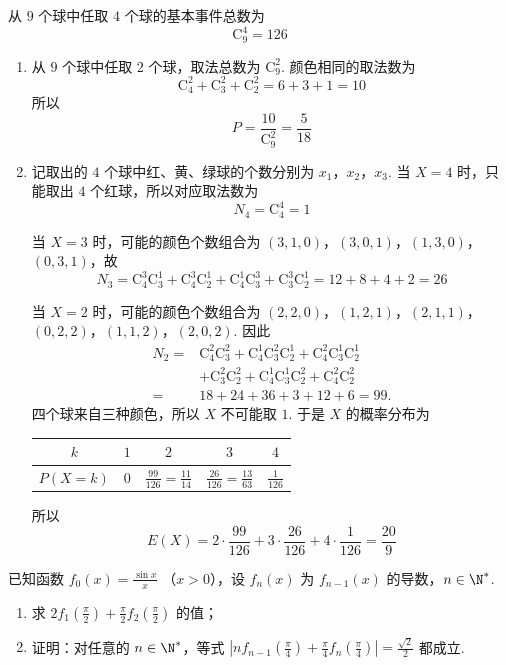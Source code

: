 \begin{solution}
从 \(9\) 个球中任取 \(4\) 个球的基本事件总数为
\[
\mathrm C_9^4=126
\]

\begin{enumerate}
\item 从 \(9\) 个球中任取 \(2\) 个球，取法总数为 \(\mathrm C_9^2\). 颜色相同的取法数为
\[
\mathrm C_4^2+\mathrm C_3^2+\mathrm C_2^2=6+3+1=10
\]
所以
\[
P=\frac{10}{\mathrm C_9^2}=\frac5{18}
\]

\item 记取出的 \(4\) 个球中红、黄、绿球的个数分别为 \(x_1\)，\(x_2\)，\(x_3\). 当 \(X=4\) 时，只能取出 \(4\) 个红球，所以对应取法数为
\[
N_4=\mathrm C_4^4=1
\]

当 \(X=3\) 时，可能的颜色个数组合为 \((3,1,0)\)，\((3,0,1)\)，\((1,3,0)\)，\((0,3,1)\)，故
\[
N_3=\mathrm C_4^3\mathrm C_3^1+\mathrm C_4^3\mathrm C_2^1+\mathrm C_4^1\mathrm C_3^3+\mathrm C_3^3\mathrm C_2^1=12+8+4+2=26
\]

当 \(X=2\) 时，可能的颜色个数组合为 \((2,2,0)\)，\((1,2,1)\)，\((2,1,1)\)，\((0,2,2)\)，\((1,1,2)\)，\((2,0,2)\).
因此
\[
\begin{aligned}
N_2={}&\mathrm C_4^2\mathrm C_3^2+\mathrm C_4^1\mathrm C_3^2\mathrm C_2^1+\mathrm C_4^2\mathrm C_3^1\mathrm C_2^1\\
&+\mathrm C_3^2\mathrm C_2^2+\mathrm C_4^1\mathrm C_3^1\mathrm C_2^2+\mathrm C_4^2\mathrm C_2^2\\
={}&18+24+36+3+12+6=99.
\end{aligned}
\]
四个球来自三种颜色，所以 \(X\) 不可能取 \(1\). 于是 \(X\) 的概率分布为

\begin{center}
\begin{tabular}{c|cccc}
\(k\) & \(1\) & \(2\) & \(3\) & \(4\) \\
\hline
\(P(X=k)\) & \(0\) & \(\frac{99}{126}=\frac{11}{14}\) & \(\frac{26}{126}=\frac{13}{63}\) & \(\frac1{126}\)
\end{tabular}
\end{center}

所以
\[
E(X)=2\cdot\frac{99}{126}+3\cdot\frac{26}{126}+4\cdot\frac1{126}=\frac{20}{9}
\]
\end{enumerate}
\end{solution}

\begin{problem}
已知函数 \( f_{0}(x) = \frac{\sin x}{x} \) （\(x > 0\)），设 \(f_{n}(x)\) 为 \(f_{n-1}(x)\) 的导数，\(n \in \N^{*}\).
\begin{enumerate}
\item 求 \(2f_{1}\left(\frac{\pi}{2}\right) + \frac{\pi}{2}f_{2}\left(\frac{\pi}{2}\right)\) 的值；
\item 证明：对任意的 \(n \in \N^{*}\)，等式 \(\left|n f_{n-1}\left(\frac{\pi}{4}\right) + \frac{\pi}{4}f_{n}\left(\frac{\pi}{4}\right)\right| = \frac{\sqrt{2}}{2}\) 都成立.
\end{enumerate}
\end{problem}

